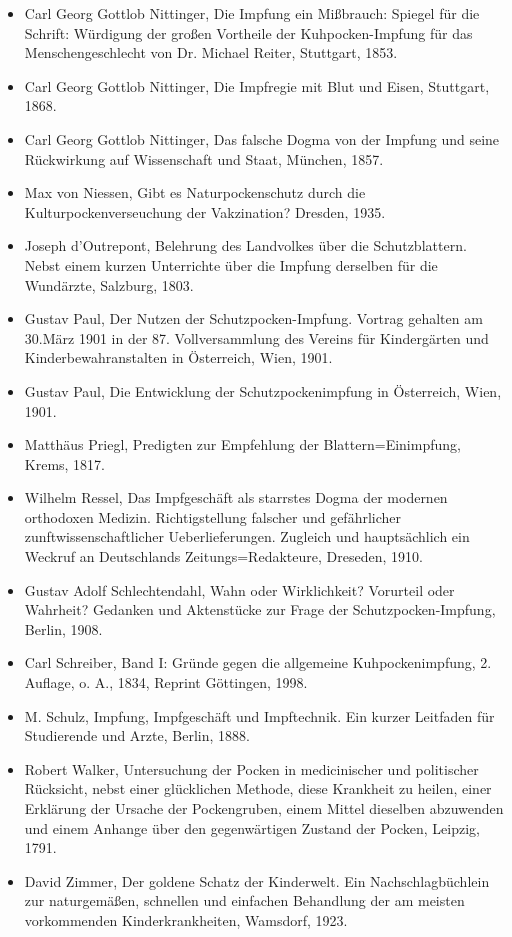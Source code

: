\documentclass[
    a4paper,
    12pt,
    hyphens,
    chapterprefix=true,
    headheight=33pt,
    footheight=29pt,
    headings=optiontohead, %
]{scrartcl}
\begin{document}
{\begin{itemize}
\item{Carl Georg Gottlob Nittinger, Die Impfung ein Mißbrauch: Spiegel für die Schrift: Würdigung der großen Vortheile der Kuhpocken-Impfung für das Menschengeschlecht von Dr. Michael Reiter, Stuttgart, 1853.}
\item{Carl Georg Gottlob Nittinger, Die Impfregie mit Blut und Eisen, Stuttgart, 1868.}
\item{Carl Georg Gottlob Nittinger, Das falsche Dogma von der Impfung und seine Rückwirkung auf Wissenschaft und Staat, München, 1857.}
\item{Max von Niessen, Gibt es Naturpockenschutz durch die Kulturpockenverseuchung der Vakzination? Dresden, 1935.}
\item{Joseph d'Outrepont, Belehrung des Landvolkes über die Schutzblattern. Nebst einem kurzen Unterrichte über die Impfung derselben für die Wundärzte, Salzburg, 1803.}
\item{Gustav Paul, Der Nutzen der Schutzpocken-Impfung. Vortrag gehalten am 30.März 1901 in der 87. Vollversammlung des Vereins für Kindergärten und Kinderbewahranstalten in Österreich, Wien, 1901.}
\item{Gustav Paul, Die Entwicklung der Schutzpockenimpfung in Österreich, Wien, 1901.}
\item{Matthäus Priegl, Predigten zur Empfehlung der Blattern=Einimpfung, Krems, 1817.}
\item{Wilhelm Ressel, Das Impfgeschäft als starrstes Dogma der modernen orthodoxen Medizin. Richtigstellung falscher und gefährlicher zunftwissenschaftlicher Ueberlieferungen. Zugleich und hauptsächlich ein Weckruf an Deutschlands Zeitungs=Redakteure, Dreseden, 1910.}
\item{Gustav Adolf Schlechtendahl, Wahn oder Wirklichkeit? Vorurteil oder Wahrheit? Gedanken und Aktenstücke zur Frage der Schutzpocken-Impfung, Berlin, 1908.}
\item{Carl Schreiber, Band I: Gründe gegen die allgemeine Kuhpockenimpfung, 2. Auflage, o. A., 1834, Reprint Göttingen, 1998.}
\item{M. Schulz, Impfung, Impfgeschäft und Impftechnik. Ein kurzer Leitfaden für Studierende und Arzte, Berlin, 1888.}
\item{Robert Walker, Untersuchung der Pocken in medicinischer und politischer Rücksicht, nebst einer glücklichen Methode, diese Krankheit zu heilen, einer Erklärung der Ursache der Pockengruben, einem Mittel dieselben abzuwenden und einem Anhange über den gegenwärtigen Zustand der Pocken, Leipzig, 1791.}
\item{David Zimmer, Der goldene Schatz der Kinderwelt. Ein Nachschlagbüchlein zur naturgemäßen, schnellen und einfachen Behandlung der am meisten vorkommenden Kinderkrankheiten, Wamsdorf, 1923.}
\end{itemize}

}
\end{document}
